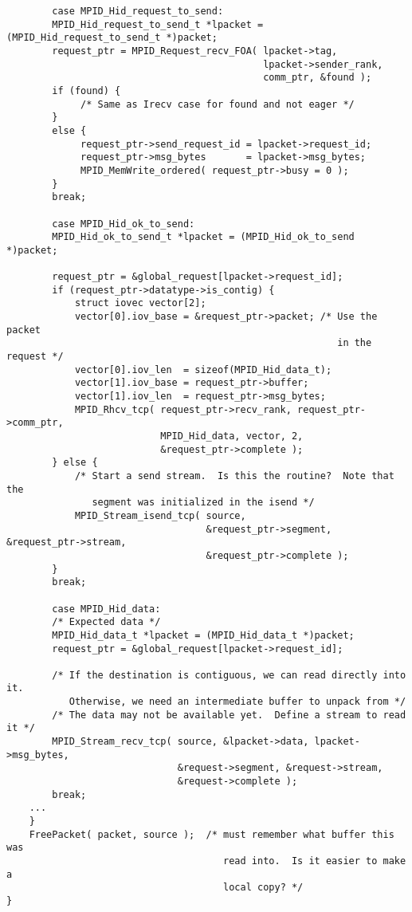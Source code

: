 \begin{verbatim}
        case MPID_Hid_request_to_send:
        MPID_Hid_request_to_send_t *lpacket = (MPID_Hid_request_to_send_t *)packet;
        request_ptr = MPID_Request_recv_FOA( lpacket->tag, 
                                             lpacket->sender_rank, 
                                             comm_ptr, &found );
        if (found) {
             /* Same as Irecv case for found and not eager */
        }
        else {
             request_ptr->send_request_id = lpacket->request_id;
             request_ptr->msg_bytes       = lpacket->msg_bytes;
             MPID_MemWrite_ordered( request_ptr->busy = 0 );
        }
        break;

        case MPID_Hid_ok_to_send:
        MPID_Hid_ok_to_send_t *lpacket = (MPID_Hid_ok_to_send *)packet;

        request_ptr = &global_request[lpacket->request_id];
        if (request_ptr->datatype->is_contig) {
            struct iovec vector[2];
            vector[0].iov_base = &request_ptr->packet; /* Use the packet 
                                                          in the request */
            vector[0].iov_len  = sizeof(MPID_Hid_data_t);
            vector[1].iov_base = request_ptr->buffer;
            vector[1].iov_len  = request_ptr->msg_bytes;
            MPID_Rhcv_tcp( request_ptr->recv_rank, request_ptr->comm_ptr, 
                           MPID_Hid_data, vector, 2, 
                           &request_ptr->complete );
        } else {
            /* Start a send stream.  Is this the routine?  Note that the
               segment was initialized in the isend */
            MPID_Stream_isend_tcp( source, 
                                   &request_ptr->segment, &request_ptr->stream,
                                   &request_ptr->complete );
        }
        break;

        case MPID_Hid_data:
        /* Expected data */
        MPID_Hid_data_t *lpacket = (MPID_Hid_data_t *)packet;
        request_ptr = &global_request[lpacket->request_id];

        /* If the destination is contiguous, we can read directly into it.
           Otherwise, we need an intermediate buffer to unpack from */
        /* The data may not be available yet.  Define a stream to read it */
        MPID_Stream_recv_tcp( source, &lpacket->data, lpacket->msg_bytes, 
                              &request->segment, &request->stream, 
                              &request->complete );
        break;
    ...
    }
    FreePacket( packet, source );  /* must remember what buffer this was
                                      read into.  Is it easier to make a 
                                      local copy? */
}
\end{verbatim}

